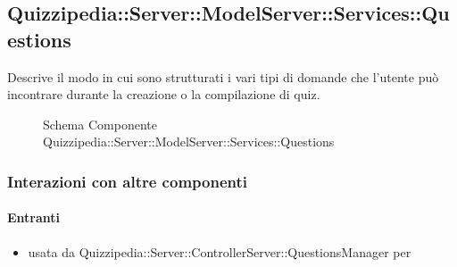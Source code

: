 \subsection{Quizzipedia::Server::ModelServer::Services::Questions}
Descrive il modo in cui sono strutturati i vari tipi di domande che l'utente può incontrare durante la creazione o la compilazione di quiz.
\begin{figure}[H]
\centering
\noindent{}
\caption[Schema Componente Quizzipedia::Server::ModelServer::Services::Questions]{Schema Componente Quizzipedia::Server::ModelServer::Services::Questions}
\end{figure}
\subsubsection{Interazioni con altre componenti}
\paragraph{Entranti}
\begin{itemize}
\item usata da Quizzipedia::Server::ControllerServer::QuestionsManager per 
\end{itemize}
